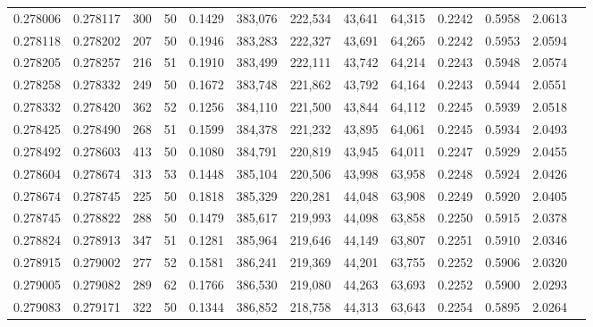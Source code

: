\begin{tabular}{rrrrrrrrrrrrr}
0.278006 & 0.278117 &   300 &  50 &                                     0.1429 & 383,076 & 222,534 &  43,641 &  64,315 & 0.2242 & 0.5958 & 2.0613 \\
0.278118 & 0.278202 &   207 &  50 &                                     0.1946 & 383,283 & 222,327 &  43,691 &  64,265 & 0.2242 & 0.5953 & 2.0594 \\
0.278205 & 0.278257 &   216 &  51 &                                     0.1910 & 383,499 & 222,111 &  43,742 &  64,214 & 0.2243 & 0.5948 & 2.0574 \\
0.278258 & 0.278332 &   249 &  50 &                                     0.1672 & 383,748 & 221,862 &  43,792 &  64,164 & 0.2243 & 0.5944 & 2.0551 \\
0.278332 & 0.278420 &   362 &  52 &                                     0.1256 & 384,110 & 221,500 &  43,844 &  64,112 & 0.2245 & 0.5939 & 2.0518 \\
0.278425 & 0.278490 &   268 &  51 &                                     0.1599 & 384,378 & 221,232 &  43,895 &  64,061 & 0.2245 & 0.5934 & 2.0493 \\
0.278492 & 0.278603 &   413 &  50 &                                     0.1080 & 384,791 & 220,819 &  43,945 &  64,011 & 0.2247 & 0.5929 & 2.0455 \\
0.278604 & 0.278674 &   313 &  53 &                                     0.1448 & 385,104 & 220,506 &  43,998 &  63,958 & 0.2248 & 0.5924 & 2.0426 \\
0.278674 & 0.278745 &   225 &  50 &                                     0.1818 & 385,329 & 220,281 &  44,048 &  63,908 & 0.2249 & 0.5920 & 2.0405 \\
0.278745 & 0.278822 &   288 &  50 &                                     0.1479 & 385,617 & 219,993 &  44,098 &  63,858 & 0.2250 & 0.5915 & 2.0378 \\
0.278824 & 0.278913 &   347 &  51 &                                     0.1281 & 385,964 & 219,646 &  44,149 &  63,807 & 0.2251 & 0.5910 & 2.0346 \\
0.278915 & 0.279002 &   277 &  52 &                                     0.1581 & 386,241 & 219,369 &  44,201 &  63,755 & 0.2252 & 0.5906 & 2.0320 \\
0.279005 & 0.279082 &   289 &  62 &                                     0.1766 & 386,530 & 219,080 &  44,263 &  63,693 & 0.2252 & 0.5900 & 2.0293 \\
0.279083 & 0.279171 &   322 &  50 &                                     0.1344 & 386,852 & 218,758 &  44,313 &  63,643 & 0.2254 & 0.5895 & 2.0264 \\

\end{tabular}
